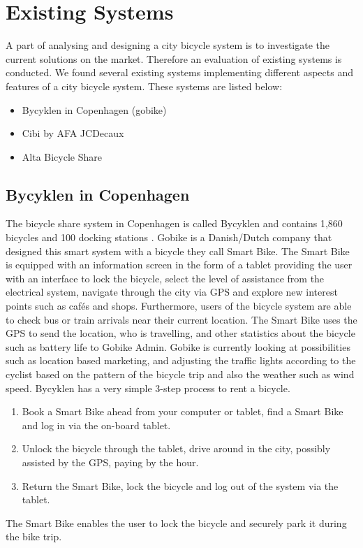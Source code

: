 \section{Existing Systems}
A part of analysing and designing a city bicycle system is to investigate the current solutions on the market. 
Therefore an evaluation of existing systems is conducted.
We found several existing systems implementing different aspects and features of a city bicycle system. 
These systems are listed below:
\begin{itemize}
\item Bycyklen in Copenhagen (gobike)
\item Cibi by AFA JCDecaux
\item Alta Bicycle Share
\end{itemize}
\subsection{Bycyklen in Copenhagen}
The bicycle share system in Copenhagen is called Bycyklen and contains 1,860 bicycles and 100 docking stations \citep{misc:bycyklen}. 
Gobike is a Danish/Dutch company that designed this smart system with a bicycle they call Smart Bike. 
The Smart Bike is equipped with an information screen in the form of a tablet providing the user with an interface to lock the bicycle, select the level of assistance from the electrical system, navigate through the city via GPS and explore new interest points such as cafés and shops.
Furthermore, users of the bicycle system are able to check bus or train arrivals near their current location.
The Smart Bike uses the GPS to send the location, who is travelling, and other statistics about the bicycle such as battery life to Gobike Admin.
Gobike is currently looking at possibilities such as location based marketing, and adjusting the traffic lights according to the cyclist based on the pattern of the bicycle trip and also the weather such as wind speed.
Bycyklen has a very simple 3-step process to rent a bicycle.
\begin{enumerate}
\item Book a Smart Bike ahead from your computer or tablet, find a Smart Bike and log in via the on-board tablet.
\item Unlock the bicycle through the tablet, drive around in the city, possibly assisted by the GPS, paying by the hour.
\item Return the Smart Bike, lock the bicycle and log out of the system via the tablet.
\end{enumerate}
The Smart Bike enables the user to lock the bicycle and securely park it during the bike trip.

